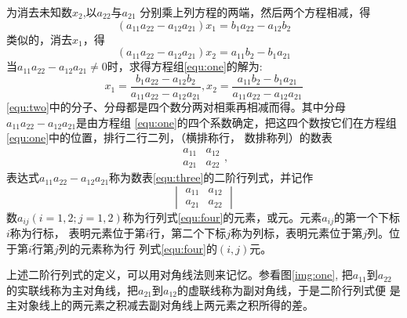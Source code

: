 为消去未知数\begin{math}x_2\end{math},以\begin{math}a_{22}\end{math}与\begin{math}a_{21}\end{math}
分别乘上列方程的两端，然后两个方程相减，得\\
\begin{equation*}
(a_{11}a_{22}-a_{12}a_{21})x_1=b_1a_{22}-a_{12}b_2
\end{equation*}
类似的，消去\begin{math}x_1\end{math}，得
\begin{equation*}
(a_{11}a_{22}-a_{12}a_{21})x_2=a_{11}b_2-b_1a_{21}
\end{equation*}
当$a_{11}a_{22}-a_{12}a_{21}\neq0$时，求得方程组\ref{equ:one}的解为:
\begin{equation}
\label{equ:two}
x_1 = \frac{b_1a_{22}-a_{12}b_2}{a_{11}a_{22}-a_{12}a_{21}},x_2 = \frac{a_{11}b_2-b_1a_{21}}{a_{11}a_{22}-a_{12}a_{21}}
\end{equation}
\ref{equ:two}中的分子、分母都是四个数分两对相乘再相减而得。其中分母$a_{11}a_{22}-a_{12}a_{21}$是由方程组
\ref{equ:one}的四个系数确定，把这四个数按它们在方程组\ref{equ:one}中的位置，排行二行二列，（横排称行，
数排称列）的数表
\begin{equation}
  \label{equ:three}
\begin{array}{ccc}
  a_{11} & a_{12}\\
  a_{21} & a_{22}
\end{array},
\end{equation}
表达式$a_{11}a_{22}-a_{12}a_{21}$称为数表\ref{equ:three}的二阶行列式，并记作
\begin{equation}
  \label{equ:four}
  \begin{vmatrix}
  a_{11} & a_{12}\\
  a_{21} & a_{22}
\end{vmatrix}
\end{equation}
数$a_{ij}(i=1,2;j=1,2)$称为行列式\ref{equ:four}的元素，或元。元素$a_{ij}$的第一个下标$i$称为行标，
表明元素位于第$i$行，第二个下标$j$称为列标，表明元素位于第$j$列。位于第$i$行第$j$列的元素称为行
列式\ref{equ:four}的$(i,j)$元。

上述二阶行列式的定义，可以用对角线法则来记忆。参看图\ref{img:one},
\label{img:one} %
把$a_{11}$到$a_{22}$的实联线称为主对角线，把$a_{21}$到$a_{12}$的虚联线称为副对角线，于是二阶行列式便
是主对象线上的两元素之积减去副对角线上两元素之积所得的差。

